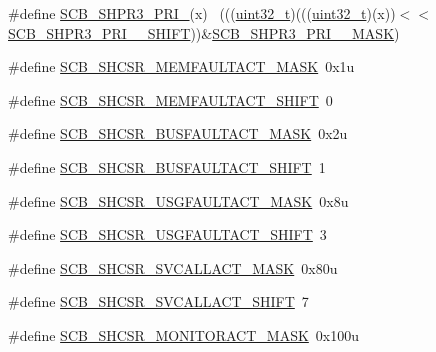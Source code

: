 \begin{DoxyCompactItemize}
\item 
\#define \hyperlink{group___s_c_b___register___masks_gaab039efcc046b9e78aa68a70957a4194}{S\+C\+B\+\_\+\+S\+H\+P\+R3\+\_\+\+P\+R\+I\+\_}(x)                                        ~(((\hyperlink{_p_e___types_8h_a33594304e786b158f3fb30289278f5af}{uint32\+\_\+t})(((\hyperlink{_p_e___types_8h_a33594304e786b158f3fb30289278f5af}{uint32\+\_\+t})(x))$<$$<$\hyperlink{group___s_c_b___register___masks_ga28a5f46e257ba81d93a426436b8c795a}{S\+C\+B\+\_\+\+S\+H\+P\+R3\+\_\+\+P\+R\+I\+\_\+\_\+\+S\+H\+I\+FT}))\&\hyperlink{group___s_c_b___register___masks_gad0d8244bc4b757250164da7a7f5406ce}{S\+C\+B\+\_\+\+S\+H\+P\+R3\+\_\+\+P\+R\+I\+\_\+\_\+\+M\+A\+SK})
\item 
\#define \hyperlink{group___s_c_b___register___masks_gad3537ba4bbb68c7c598508c3719d7a4c}{S\+C\+B\+\_\+\+S\+H\+C\+S\+R\+\_\+\+M\+E\+M\+F\+A\+U\+L\+T\+A\+C\+T\+\_\+\+M\+A\+SK}~0x1u
\item 
\#define \hyperlink{group___s_c_b___register___masks_gae410ef4c07908e9e0cf55d08cac2aa35}{S\+C\+B\+\_\+\+S\+H\+C\+S\+R\+\_\+\+M\+E\+M\+F\+A\+U\+L\+T\+A\+C\+T\+\_\+\+S\+H\+I\+FT}~0
\item 
\#define \hyperlink{group___s_c_b___register___masks_gac9b941a1848ab5648220ac724811626d}{S\+C\+B\+\_\+\+S\+H\+C\+S\+R\+\_\+\+B\+U\+S\+F\+A\+U\+L\+T\+A\+C\+T\+\_\+\+M\+A\+SK}~0x2u
\item 
\#define \hyperlink{group___s_c_b___register___masks_ga32a717e07bf15df325707ed464931ebd}{S\+C\+B\+\_\+\+S\+H\+C\+S\+R\+\_\+\+B\+U\+S\+F\+A\+U\+L\+T\+A\+C\+T\+\_\+\+S\+H\+I\+FT}~1
\item 
\#define \hyperlink{group___s_c_b___register___masks_gafd80e2063c3bdb176ccace11cedc30fb}{S\+C\+B\+\_\+\+S\+H\+C\+S\+R\+\_\+\+U\+S\+G\+F\+A\+U\+L\+T\+A\+C\+T\+\_\+\+M\+A\+SK}~0x8u
\item 
\#define \hyperlink{group___s_c_b___register___masks_ga0b4de7cda03d088ce7d65ac0dc9de6f0}{S\+C\+B\+\_\+\+S\+H\+C\+S\+R\+\_\+\+U\+S\+G\+F\+A\+U\+L\+T\+A\+C\+T\+\_\+\+S\+H\+I\+FT}~3
\item 
\#define \hyperlink{group___s_c_b___register___masks_ga4bb1b1dfbed424de0294b52b181bb962}{S\+C\+B\+\_\+\+S\+H\+C\+S\+R\+\_\+\+S\+V\+C\+A\+L\+L\+A\+C\+T\+\_\+\+M\+A\+SK}~0x80u
\item 
\#define \hyperlink{group___s_c_b___register___masks_gaba820858a54c18f1280a32238d14e5e0}{S\+C\+B\+\_\+\+S\+H\+C\+S\+R\+\_\+\+S\+V\+C\+A\+L\+L\+A\+C\+T\+\_\+\+S\+H\+I\+FT}~7
\item 
\#define \hyperlink{group___s_c_b___register___masks_ga4b63e9fdfdae08017acf41205124bd5e}{S\+C\+B\+\_\+\+S\+H\+C\+S\+R\+\_\+\+M\+O\+N\+I\+T\+O\+R\+A\+C\+T\+\_\+\+M\+A\+SK}~0x100u
$$
\end{DoxyCompactItemize}
